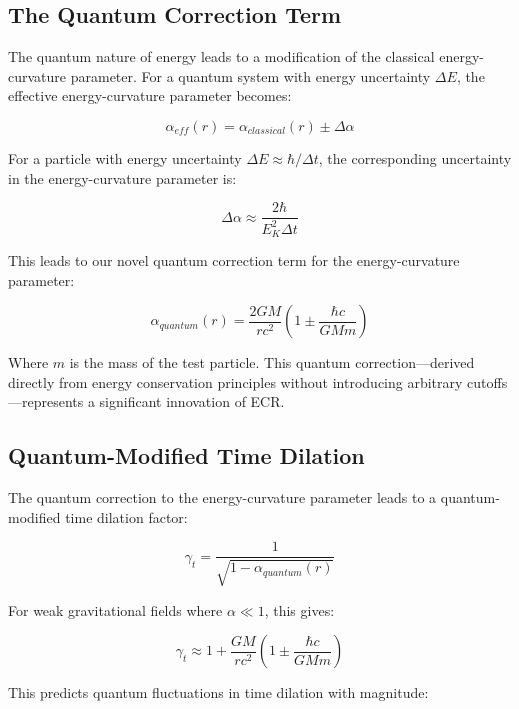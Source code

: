 \documentclass[11pt,a4paper]{article}
\newcommand{\keyequation}[2]{
    \begin{equation}
        \boxed{#1} \tag{#2}
    \end{equation}
}
\begin{document}
\subsection{The Quantum Correction Term}

The quantum nature of energy leads to a modification of the classical energy-curvature parameter. For a quantum system with energy uncertainty $\Delta E$, the effective energy-curvature parameter becomes:

\begin{equation}
    \alpha_{eff}(r) = \alpha_{classical}(r) \pm \Delta\alpha
\end{equation}

For a particle with energy uncertainty $\Delta E \approx \hbar/\Delta t$, the corresponding uncertainty in the energy-curvature parameter is:

\begin{equation}
    \Delta\alpha \approx \frac{2\hbar}{E_K^2 \Delta t}
\end{equation}

This leads to our novel quantum correction term for the energy-curvature parameter:

\keyequation{\alpha_{quantum}(r) = \frac{2GM}{rc^2}\left(1 \pm \frac{\hbar c}{GMm}\right)}{5}

Where $m$ is the mass of the test particle. This quantum correction—derived directly from energy conservation principles without introducing arbitrary cutoffs—represents a significant innovation of ECR.

\subsection{Quantum-Modified Time Dilation}

The quantum correction to the energy-curvature parameter leads to a quantum-modified time dilation factor:

\begin{equation}
    \gamma_t = \frac{1}{\sqrt{1-\alpha_{quantum}(r)}}
\end{equation}

For weak gravitational fields where $\alpha \ll 1$, this gives:

\begin{equation}
    \gamma_t \approx 1 + \frac{GM}{rc^2}\left(1 \pm \frac{\hbar c}{GMm}\right)
\end{equation}

This predicts quantum fluctuations in time dilation with magnitude:
\end{document}
